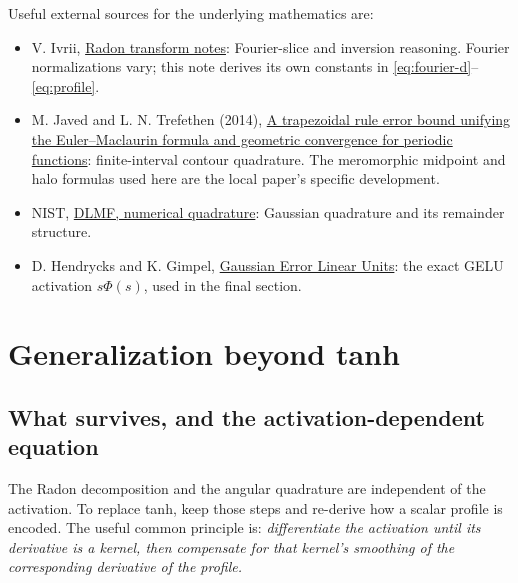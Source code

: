 \documentclass[11pt]{article}
\begin{document}
Useful external sources for the underlying mathematics are:
\begin{itemize}[leftmargin=*]
\item V. Ivrii, \href{https://www.math.utoronto.ca/courses/apm346h1/20181/PDE-textbook/Chapter9/S9.A.html}{Radon transform notes}: Fourier-slice and inversion reasoning. Fourier normalizations vary; this note derives its own constants in \eqref{eq:fourier-d}--\eqref{eq:profile}.
\item M. Javed and L. N. Trefethen (2014), \href{https://doi.org/10.1098/rspa.2013.0571}{A trapezoidal rule error bound unifying the Euler--Maclaurin formula and geometric convergence for periodic functions}: finite-interval contour quadrature. The meromorphic midpoint and halo formulas used here are the local paper's specific development.
\item NIST, \href{https://dlmf.nist.gov/3.5}{DLMF, numerical quadrature}: Gaussian quadrature and its remainder structure.
\item D. Hendrycks and K. Gimpel, \href{https://arxiv.org/abs/1606.08415}{Gaussian Error Linear Units}: the exact GELU activation $s\Phi(s)$, used in the final section.
\end{itemize}

\section{Generalization beyond tanh}
\label{sec:generalization}
\subsection{What survives, and the activation-dependent equation}

The Radon decomposition and the angular quadrature are independent of the activation. To replace tanh, keep those steps and re-derive how a scalar profile is encoded. The useful common principle is: \emph{differentiate the activation until its derivative is a kernel, then compensate for that kernel's smoothing of the corresponding derivative of the profile.}
\end{document}

